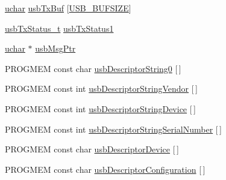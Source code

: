 \begin{DoxyCompactItemize}
\item 
\hyperlink{mhvlib-_vusb-_console_2vusb_2usbdrv_8h_aa8ddf20cdd716b652e76e23e5e700893}{uchar} \hyperlink{mhvlib-_vusb-_console_2vusb_2usbdrv_8c_a2e8d07fcad8aa462b6a1f51e7968f3cb}{usb\-Tx\-Buf} \mbox{[}\hyperlink{mhvlib-_vusb-_console_2vusb_2usbdrv_8h_a1c541dbab181ea7bd3da61b892430988}{U\-S\-B\-\_\-\-B\-U\-F\-S\-I\-Z\-E}\mbox{]}
\item 
\hyperlink{mhvlib-_vusb-_keyboard_2vusb_2usbdrv_8h_ae6a25e02d49899e1862aa987a6c09ade}{usb\-Tx\-Status\-\_\-t} \hyperlink{mhvlib-_vusb-_console_2vusb_2usbdrv_8c_a8787d5ad73afd0d305818dfbdce2bc85}{usb\-Tx\-Status1}
\item 
\hyperlink{mhvlib-_vusb-_console_2vusb_2usbdrv_8h_aa8ddf20cdd716b652e76e23e5e700893}{uchar} $\ast$ \hyperlink{mhvlib-_vusb-_console_2vusb_2usbdrv_8c_a5f78c8584830588b8c0c8f2a27772f8e}{usb\-Msg\-Ptr}
\item 
P\-R\-O\-G\-M\-E\-M const char \hyperlink{mhvlib-_vusb-_console_2vusb_2usbdrv_8c_a367afe22c903b4b58805cc451c22cb99}{usb\-Descriptor\-String0} \mbox{[}$\,$\mbox{]}
\item 
P\-R\-O\-G\-M\-E\-M const int \hyperlink{mhvlib-_vusb-_console_2vusb_2usbdrv_8c_aa92b0dfd57d302ff023bfb7ed868c2a1}{usb\-Descriptor\-String\-Vendor} \mbox{[}$\,$\mbox{]}
\item 
P\-R\-O\-G\-M\-E\-M const int \hyperlink{mhvlib-_vusb-_console_2vusb_2usbdrv_8c_a1f252008bbf46a3172ebf8a4f8213a60}{usb\-Descriptor\-String\-Device} \mbox{[}$\,$\mbox{]}
\item 
P\-R\-O\-G\-M\-E\-M const int \hyperlink{mhvlib-_vusb-_console_2vusb_2usbdrv_8c_a97aa1ed300e711b6eabb5cef561313a3}{usb\-Descriptor\-String\-Serial\-Number} \mbox{[}$\,$\mbox{]}
\item 
P\-R\-O\-G\-M\-E\-M const char \hyperlink{mhvlib-_vusb-_console_2vusb_2usbdrv_8c_a1b8593e30029ecfd59a89335a12db631}{usb\-Descriptor\-Device} \mbox{[}$\,$\mbox{]}
\item 
P\-R\-O\-G\-M\-E\-M const char \hyperlink{mhvlib-_vusb-_console_2vusb_2usbdrv_8c_a9a566690103d3a34df4893e7c0d3bf10}{usb\-Descriptor\-Configuration} \mbox{[}$\,$\mbox{]}
\end{DoxyCompactItemize}


